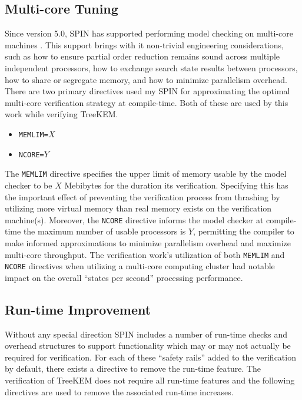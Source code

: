 \hypertarget{sec:multi-core-tuning}{%
\subsection{Multi-core Tuning}\label{sec:multi-core-tuning}}

Since version 5.0, SPIN has supported performing model checking on multi-core machines \autocite{holzmann2007design}.
This support brings with it non-trivial engineering considerations, such as how to ensure partial order reduction remains sound across multiple independent processors, how to exchange search state results between processors, how to share or segregate memory, and how to minimize parallelism overhead.
There are two primary directives used my SPIN for approximating the optimal multi-core verification strategy at compile-time.
Both of these are used by this work while verifying TreeKEM.\@

\begin{itemize}
\item
  \texttt{MEMLIM=}\(X\)
\item
  \texttt{NCORE=}\(Y\)
\end{itemize}

The \texttt{MEMLIM} directive specifies the upper limit of memory usable by the model checker to be \(X\) Mebibytes for the duration its verification.
Specifying this has the important effect of preventing the verification process from thrashing by utilizing more virtual memory than real memory exists on the verification machine(s).
Moreover, the \texttt{NCORE} directive informs the model checker at compile-time the maximum number of usable processors is \(Y\), permitting the compiler to make informed approximations to minimize parallelism overhead and maximize multi-core throughput.
The verification work's utilization of both \texttt{MEMLIM} and \texttt{NCORE} directives when utilizing a multi-core computing cluster had notable impact on the overall ``states per second'' processing performance.


\hypertarget{sec:run-time-improvement}{%
\subsection{Run-time Improvement}\label{sec:run-time-improvement}}

Without any special direction SPIN includes a number of run-time checks and overhead structures to support functionality which may or may not actually be required for verification.
For each of these ``safety rails'' added to the verification by default, there exists a directive to remove the run-time feature.
The verification of TreeKEM does not require all run-time features and the following directives are used to remove the associated run-time increases.


